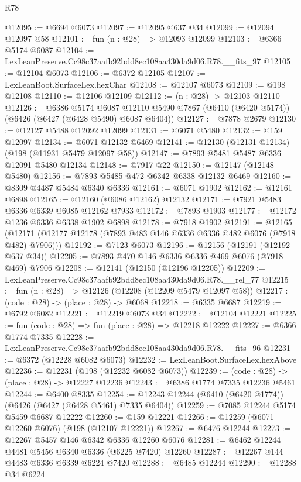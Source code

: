 \begin{lexlean}{R78}
\begin{coremodule}
@12095 := @6694 @6073
@12097 := @12095 @637 @34
@12099 := @12094 @12097 @58
@12101 := fun (n : @28) => @12093 @12099
@12103 := @6366 @5174 @6087
@12104 := LexLeanPreserve.Cc98c37aafb92bdd8ec108aa430da9d06.R78.__fits_97
@12105 := @12104 @6073
@12106 := @6372 @12105
@12107 := LexLeanBoot.SurfaceLex.hexChar
@12108 := @12107 @6073
@12109 := @198 @12108
@12110 := @12106 @12109
@12112 := (n : @28) -> @12103 @12110
@12126 := @6386
    @5174
    @6087
    @12110
    @5490
    @7867
    (@6410 (@6420 @5174))
    (@6426 (@6427 (@6428 @5490) @6087 @6404))
@12127 := @7878 @2679
@12130 := @12127 @5488 @12092 @12099
@12131 := @6071 @5480
@12132 := @159 @12097
@12134 := @6071 @12132 @6469
@12141 := @12130 (@12131 @12134) (@198 (@11931 @5479 @12097 @58))
@12147 := @7893 @5481 @5487 @6336 @12091 @5480 @12134
@12148 := @7917 @22
@12150 := @12147 (@12148 @5480)
@12156 := @7893 @5485 @472 @6342 @6338 @12132 @6469
@12160 := @8309 @4487 @5484 @6340 @6336
@12161 := @6071 @1902
@12162 := @12161 @6898
@12165 := @12160 (@6086 @12162) @12132
@12171 := @7921 @5483 @6336 @6339 @6085 @12162 @7933
@12172 := @7893 @1903
@12177 := @12172 @1236 @6336 @6338 @1902 @6898
@12178 := @7918 @1902
@12191 := @12165
    (@12171 (@12177 @12178 (@7893 @483 @146 @6336 @6336 @482 @6076 (@7918 @482) @7906)))
@12192 := @7123 @6073
@12196 := @12156 (@12191 (@12192 @637 @34))
@12205 := @7893 @470 @146 @6336 @6336 @469 @6076 (@7918 @469) @7906
@12208 := @12141 (@12150 (@12196 @12205))
@12209 := LexLeanPreserve.Cc98c37aafb92bdd8ec108aa430da9d06.R78.__rel_77
@12215 := fun (n : @28) => @12126 (@12208 (@12209 @5479 @12097 @58))
@12217 := (code : @28) -> (place : @28) -> @6068
@12218 := @6335 @6687
@12219 := @6792 @6082
@12221 := @12219 @6073 @34
@12222 := @12104 @12221
@12225 := fun (code : @28) => fun (place : @28) => @12218 @12222
@12227 := @6366 @1774 @7335
@12228 := LexLeanPreserve.Cc98c37aafb92bdd8ec108aa430da9d06.R78.__fits_96
@12231 := @6372 (@12228 @6082 @6073)
@12232 := LexLeanBoot.SurfaceLex.hexAbove
@12236 := @12231 (@198 (@12232 @6082 @6073))
@12239 := (code : @28) -> (place : @28) -> @12227 @12236
@12243 := @6386 @1774 @7335 @12236 @5461
@12244 := @6400 @8335
@12254 := @12243 @12244 (@6410 (@6420 @1774)) (@6426 (@6427 (@6428 @5461) @7335 @6404))
@12259 := @7085 @12244 @5174 @5459 @6687 @12222
@12260 := @159 @12221
@12266 := @12259 (@6071 @12260 @6076) (@198 (@12107 @12221))
@12267 := @6476 @12244
@12273 := @12267 @5457 @146 @6342 @6336 @12260 @6076
@12281 := @6462 @12244 @4481 @5456 @6340 @6336 (@6225 @7420) @12260
@12287 := @12267 @144 @4483 @6336 @6339 @6224 @7420
@12288 := @6485 @12244
@12290 := @12288 @34 @6224

\end{coremodule}
\end{lexlean}
